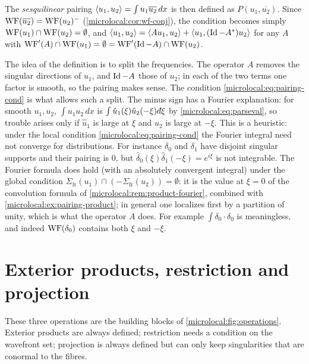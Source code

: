 The \emph{sesquilinear} pairing $\langle u_1, u_2\rangle=\int u_1\overline{u_2}\,dx$
is then defined as $P(u_1,\overline{u_2})$. Since
$\operatorname{WF}(\overline{u_2})=\operatorname{WF}(u_2)^-$ (\cref{microlocal:cor:wf-conj}), the
condition becomes simply $\operatorname{WF}(u_1)\cap\operatorname{WF}(u_2)=\emptyset$, and
$\langle u_1, u_2\rangle=\langle Au_1, u_2\rangle+\langle u_1, (\operatorname{Id}-A^*)u_2\rangle$ for any $A$ with
$\operatorname{WF}'(A)\cap\operatorname{WF}(u_1)=\emptyset=\operatorname{WF}'(\operatorname{Id}-A)\cap\operatorname{WF}(u_2)$.

\begin{discussion}
  The idea of the definition is to split the frequencies. The operator $A$
  removes the singular directions of $u_1$, and $\operatorname{Id}-A$ those of $u_2$; in
  each of the two terms one factor is smooth, so the pairing makes sense. The
  condition \eqref{microlocal:eq:pairing-cond} is what allows such a split.
  The minus sign has a Fourier explanation: for smooth $u_1,u_2$,
  $\int u_1u_2\,dx$ is $\int\hat u_1(\xi)\hat u_2(-\xi)\,\dbar\xi$ by
  \eqref{microlocal:eq:parseval}, so trouble arises only if $\hat u_1$ is large
  at $\xi$ and $\hat u_2$ is large at $-\xi$. This is a heuristic: under the
  local condition \eqref{microlocal:eq:pairing-cond} the Fourier integral need
  not converge for distributions. For instance $\delta_0$ and $\delta_1$ have
  disjoint singular supports and their pairing is $0$, but
  $\hat\delta_0(\xi)\hat\delta_1(-\xi)=e^{i\xi}$ is not integrable. The
  Fourier formula does hold (with an absolutely convergent integral) under
  the global condition
  $\Sigma_{\mathrm{fr}}(u_1)\cap(-\Sigma_{\mathrm{fr}}(u_2))=\emptyset$: it is
  the value at $\xi=0$ of the convolution formula of
  \cref{microlocal:rem:product-fourier}, combined with
  \cref{microlocal:ex:pairing-product}; in general one localizes first by a
  partition of unity, which is what the operator $A$ does. For example $\int\delta_0\cdot\delta_0$ is meaningless, and indeed
  $\operatorname{WF}(\delta_0)$ contains both $\xi$ and $-\xi$.
\end{discussion}

\section{Exterior products, restriction and projection}\label{microlocal:sec:elementary}

These three operations are the building blocks of
\cref{microlocal:fig:operations}. Exterior products are always defined;
restriction needs a condition on the wavefront set; projection is always
defined but can only keep singularities that are conormal to the fibres.

